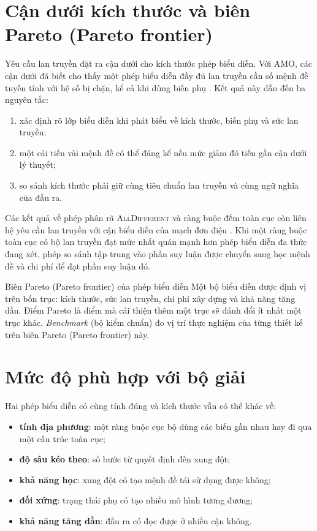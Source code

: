\section{Cận dưới kích thước và biên Pareto (Pareto frontier)}

Yêu cầu lan truyền đặt ra cận dưới cho kích thước phép biểu diễn. Với AMO, các
cận dưới đã biết cho thấy một phép biểu diễn đầy đủ lan truyền cần số mệnh đề
tuyến tính với hệ số bị chặn, kể cả khi dùng biến phụ
\parencite{kucera2019lower}. Kết quả này dẫn đến ba nguyên tắc:
\begin{enumerate}
  \item xác định rõ lớp biểu diễn khi phát biểu về kích thước, biến phụ và sức lan
        truyền;
  \item một cải tiến vài mệnh đề có thể đáng kể nếu mức giảm đó tiến gần cận dưới lý thuyết;
  \item so sánh kích thước phải giữ cùng tiêu chuẩn lan truyền và cùng ngữ
        nghĩa của đầu ra.
\end{enumerate}

Các kết quả về phép phân rã \textsc{AllDifferent} và ràng buộc đếm toàn cục
còn liên hệ yêu cầu lan truyền với cận biểu diễn của mạch đơn điệu
\parencite{bessiere2009decompositions}. Khi một ràng buộc toàn cục có
bộ lan truyền đạt mức nhất quán mạnh hơn phép biểu diễn đa thức đang xét, phép so
sánh tập trung vào phần suy luận được chuyển sang học mệnh đề và chi phí
để đạt phần suy luận đó.

\begin{keyidea}{Biên Pareto (Pareto frontier) của phép biểu diễn}
Một bộ biểu diễn được định vị trên bốn trục: kích thước, sức lan truyền, chi phí
xây dựng và khả năng tăng dần. Điểm Pareto là điểm mà cải thiện thêm một trục
sẽ đánh đổi ít nhất một trục khác. \emph{Benchmark} (bộ kiểm chuẩn) đo vị trí
thực nghiệm của từng thiết kế trên biên Pareto (Pareto frontier) này.
\end{keyidea}

\section{Mức độ phù hợp với bộ giải}

Hai phép biểu diễn có cùng tính đúng và kích thước vẫn có thể khác về:
\begin{itemize}
  \item \textbf{tính địa phương}: một ràng buộc cục bộ dùng các biến gần nhau
        hay đi qua một cấu trúc toàn cục;
  \item \textbf{độ sâu kéo theo}: số bước từ quyết định đến xung đột;
  \item \textbf{khả năng học}: xung đột có tạo mệnh đề tái sử dụng được không;
  \item \textbf{đối xứng}: trạng thái phụ có tạo nhiều mô hình tương đương;
  \item \textbf{khả năng tăng dần}: đầu ra có đọc được ở nhiều cận không.
\end{itemize}

